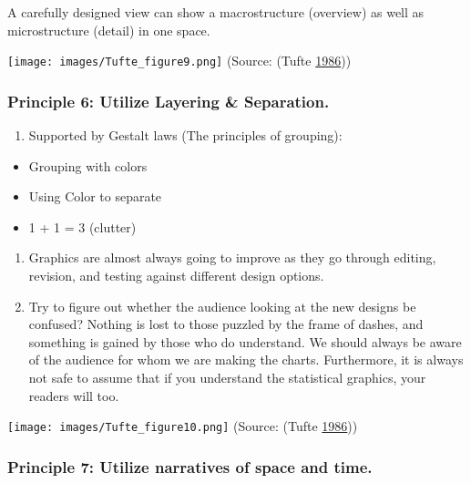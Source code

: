 \documentclass[]{book}
\providecommand{\tightlist}{%
  \setlength{\itemsep}{0pt}\setlength{\parskip}{0pt}}
\begin{document}
A carefully designed view can show a macrostructure (overview) as well as microstructure (detail) in one space.

\texttt{[image: images/Tufte\_figure9.png]}
(Source: (Tufte \protect\hyperlink{ref-The-Visual-Display-of-Quantitative-Information}{1986}))

\hypertarget{principle-6-utilize-layering-separation.}{%
\subsubsection{Principle 6: Utilize Layering \& Separation.}\label{principle-6-utilize-layering-separation.}}

\begin{enumerate}
\def\labelenumi{\arabic{enumi}.}
\tightlist
\item
  Supported by Gestalt laws (The principles of grouping):
\end{enumerate}

\begin{itemize}
\tightlist
\item
  Grouping with colors
\item
  Using Color to separate
\item
  1 + 1 = 3 (clutter)
\end{itemize}

\begin{enumerate}
\def\labelenumi{\arabic{enumi}.}
\setcounter{enumi}{1}
\item
  Graphics are almost always going to improve as they go through editing, revision, and testing against different design options.
\item
  Try to figure out whether the audience looking at the new designs be confused? Nothing is lost to those puzzled by the frame of dashes, and something is gained by those who do understand. We should always be aware of the audience for whom we are making the charts. Furthermore, it is always not safe to assume that if you understand the statistical graphics, your readers will too.
\end{enumerate}

\texttt{[image: images/Tufte\_figure10.png]}
(Source: (Tufte \protect\hyperlink{ref-The-Visual-Display-of-Quantitative-Information}{1986}))

\hypertarget{principle-7-utilize-narratives-of-space-and-time.}{%
\subsubsection{Principle 7: Utilize narratives of space and time.}\label{principle-7-utilize-narratives-of-space-and-time.}}
\end{document}
